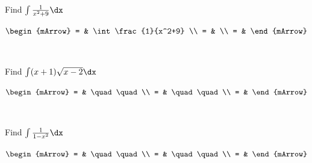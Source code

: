 \clearpage\noindent%
\begin{mtask}[resume]
   \task \begin{exercise} Find $\int \frac{1}{x^2+9} \dx$
           \begin{envSolution}
             $\begin{mArrow}
                 = & \int \frac{1}{x^2+9}     \\
		   		 = &               \\
				 = &  
              \end{mArrow}$
            \begin{shortsolution}  
			     $\quad \quad$
			\end{shortsolution}				 
           \end{envSolution}
         \end{exercise}

   \task \begin{exercise} Find $\int (x+1)\sqrt{x-2} \dx$
           \begin{envSolution}
             $\begin{mArrow}
                 = & \quad \quad              \\
		   		 = & \quad \quad              \\
				 = &  
              \end{mArrow}$
            \begin{shortsolution}  
			     $\quad \quad$
			\end{shortsolution}				 
           \end{envSolution}
         \end{exercise}
   \task \begin{exercise} Find $\int \frac{1}{1-x^2} \dx$
           \begin{envSolution}
             $\begin{mArrow}
                 = & \quad \quad              \\
		   		 = & \quad \quad              \\
				 = &  
              \end{mArrow}$
            \begin{shortsolution}  
			     $\quad \quad$
			\end{shortsolution}				 
           \end{envSolution}
         \end{exercise}
     
\end{mtask}
\clearpage


